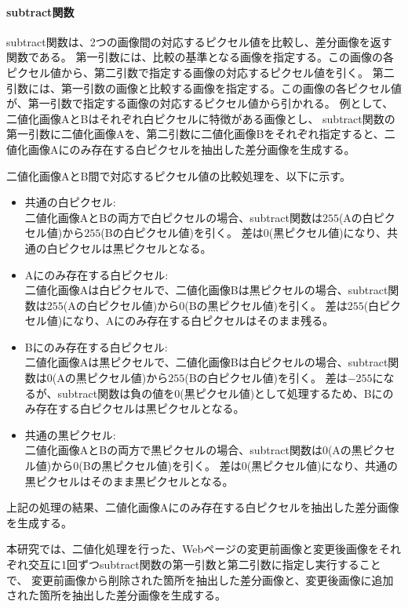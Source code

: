\paragraph{subtract関数}
subtract関数は、2つの画像間の対応するピクセル値を比較し、差分画像を返す関数である。
第一引数には、比較の基準となる画像を指定する。この画像の各ピクセル値から、第二引数で指定する画像の対応するピクセル値を引く。
第二引数には、第一引数の画像と比較する画像を指定する。この画像の各ピクセル値が、第一引数で指定する画像の対応するピクセル値から引かれる。
例として、二値化画像AとBはそれぞれ白ピクセルに特徴がある画像とし、
subtract関数の第一引数に二値化画像Aを、第二引数に二値化画像Bをそれぞれ指定すると、二値化画像Aにのみ存在する白ピクセルを抽出した差分画像を生成する。

\par
二値化画像AとB間で対応するピクセル値の比較処理を、以下に示す。
\begin{itemize}
      \setlength{\itemsep}{0pt}
            \setlength{\parsep}{0pt}
      \item 共通の白ピクセル:\\
            二値化画像AとBの両方で白ピクセルの場合、subtract関数は$255$(Aの白ピクセル値)から$255$(Bの白ピクセル値)を引く。
            差は$0$(黒ピクセル値)になり、共通の白ピクセルは黒ピクセルとなる。
      \item Aにのみ存在する白ピクセル:\\
            二値化画像Aは白ピクセルで、二値化画像Bは黒ピクセルの場合、subtract関数は$255$(Aの白ピクセル値)から$0$(Bの黒ピクセル値)を引く。
            差は$255$(白ピクセル値)になり、Aにのみ存在する白ピクセルはそのまま残る。
      \item Bにのみ存在する白ピクセル:\\
            二値化画像Aは黒ピクセルで、二値化画像Bは白ピクセルの場合、subtract関数は$0$(Aの黒ピクセル値)から$255$(Bの白ピクセル値)を引く。
            差は$-255$になるが、subtract関数は負の値を$0$(黒ピクセル値)として処理するため、Bにのみ存在する白ピクセルは黒ピクセルとなる。
      \item 共通の黒ピクセル:\\
            二値化画像AとBの両方で黒ピクセルの場合、subtract関数は$0$(Aの黒ピクセル値)から$0$(Bの黒ピクセル値)を引く。
            差は$0$(黒ピクセル値)になり、共通の黒ピクセルはそのまま黒ピクセルとなる。
\end{itemize}
上記の処理の結果、二値化画像Aにのみ存在する白ピクセルを抽出した差分画像を生成する。
\par
本研究では、二値化処理を行った、Webページの変更前画像と変更後画像をそれぞれ交互に1回ずつsubtract関数の第一引数と第二引数に指定し実行することで、
変更前画像から削除された箇所を抽出した差分画像と、変更後画像に追加された箇所を抽出した差分画像を生成する。
